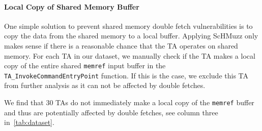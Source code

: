 \documentclass[conference]{IEEEtran}
\newcommand{\sysname}{ScHMuzz\xspace}
\newcommand{\numTAsharnessed}{30\xspace}
\begin{document}
\paragraph{Local Copy of Shared Memory Buffer}
One simple solution to prevent shared memory double fetch vulnerabilities is to copy the 
data from the shared memory to a local buffer. 
Applying \sysname only makes sense if there is a reasonable chance that the TA operates on 
shared memory. For each TA in our dataset, we manually check if the TA makes a local copy of 
the entire shared \texttt{memref} input buffer in the \texttt{TA\_InvokeCommandEntryPoint} 
function. If this is the case, we exclude this TA from further analysis as it can not be 
affected by double fetches. 

We find that \numTAsharnessed TAs do not immediately make a local copy of the 
\texttt{memref} buffer and thus are potentially affected by double fetches, see column three 
in~\autoref{tab:dataset}.




\end{document}
